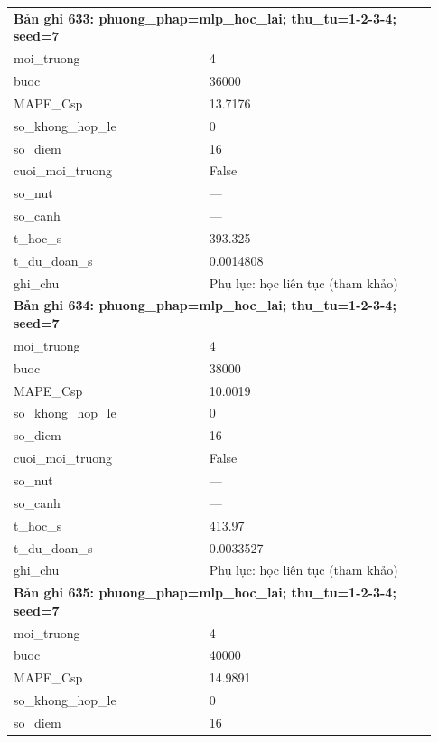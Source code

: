 \begin{longtable}{p{0.43\linewidth}p{0.50\linewidth}}
\midrule
\multicolumn{2}{p{0.95\linewidth}}{\textbf{Bản ghi 633: phuong\_phap=mlp\_hoc\_lai; thu\_tu=1-2-3-4; seed=7}} \\
moi\_\allowbreak truong & 4 \\
buoc & 36000 \\
MAPE\_\allowbreak Csp & 13.7176 \\
so\_\allowbreak khong\_\allowbreak hop\_\allowbreak le & 0 \\
so\_\allowbreak diem & 16 \\
cuoi\_\allowbreak moi\_\allowbreak truong & False \\
so\_\allowbreak nut & — \\
so\_\allowbreak canh & — \\
t\_\allowbreak hoc\_\allowbreak s & 393.325 \\
t\_\allowbreak du\_\allowbreak doan\_\allowbreak s & 0.0014808 \\
ghi\_\allowbreak chu & Phụ lục: học liên tục (tham khảo) \\
\midrule
\multicolumn{2}{p{0.95\linewidth}}{\textbf{Bản ghi 634: phuong\_phap=mlp\_hoc\_lai; thu\_tu=1-2-3-4; seed=7}} \\
moi\_\allowbreak truong & 4 \\
buoc & 38000 \\
MAPE\_\allowbreak Csp & 10.0019 \\
so\_\allowbreak khong\_\allowbreak hop\_\allowbreak le & 0 \\
so\_\allowbreak diem & 16 \\
cuoi\_\allowbreak moi\_\allowbreak truong & False \\
so\_\allowbreak nut & — \\
so\_\allowbreak canh & — \\
t\_\allowbreak hoc\_\allowbreak s & 413.97 \\
t\_\allowbreak du\_\allowbreak doan\_\allowbreak s & 0.0033527 \\
ghi\_\allowbreak chu & Phụ lục: học liên tục (tham khảo) \\
\midrule
\multicolumn{2}{p{0.95\linewidth}}{\textbf{Bản ghi 635: phuong\_phap=mlp\_hoc\_lai; thu\_tu=1-2-3-4; seed=7}} \\
moi\_\allowbreak truong & 4 \\
buoc & 40000 \\
MAPE\_\allowbreak Csp & 14.9891 \\
so\_\allowbreak khong\_\allowbreak hop\_\allowbreak le & 0 \\
so\_\allowbreak diem & 16 \\

\end{longtable}
